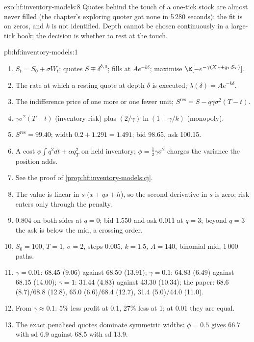 \begin{solution}{exo:hf:inventory-models:8}
Quotes behind the touch of a one-tick stock are almost never filled (the chapter's exploring quoter got none in 5\,280 seconds): the fit is on zeros,
and $k$ is not identified. Depth cannot be chosen continuously in a large-tick book; the decision is whether to rest at the touch.
\end{solution}

\begin{solution}{pb:hf:inventory-models:1}
\begin{enumerate}
\item $S_t=S_0+\sigma W_t$; quotes $S\mp\delta^{b,a}$; fills at $Ae^{-k\delta}$; maximise $\E[-e^{-\gamma(X_T+q_TS_T)}]$.
\item The rate at which a resting quote at depth $\delta$ is executed; $\lambda(\delta)=Ae^{-k\delta}$.
\item The indifference price of one more or one fewer unit; $S^{\mathrm{res}}=S-q\gamma\sigma^2(T-t)$.
\item $\gamma\sigma^2(T-t)$ (inventory risk) plus $(2/\gamma)\ln(1+\gamma/k)$ (monopoly).
\item $S^{\mathrm{res}}=99.40$; width $0.2+1.291=1.491$; bid 98.65, ask 100.15.
\item A cost $\phi\int q^2dt+\alpha q_T^2$ on held inventory; $\phi=\tfrac12\gamma\sigma^2$ charges the variance the position adds.
\item See the proof of \cref{prop:hf:inventory-models:cj}.
\item The value is linear in $s$ ($x+qs+h$), so the second derivative in $s$ is zero; risk enters only through the penalty.
\item 0.804 on both sides at $q=0$; bid 1.550 and ask 0.011 at $q=3$; beyond $q=3$ the ask is below the mid, a crossing order.
\item $S_0=100$, $T=1$, $\sigma=2$, steps 0.005, $k=1.5$, $A=140$, binomial mid, 1\,000 paths.
\item $\gamma=0.01$: 68.45 (9.06) against 68.50 (13.91); $\gamma=0.1$: 64.83 (6.49) against 68.15 (14.00); $\gamma=1$: 31.44 (4.83) against 43.30
(10.34); the paper: 68.6 (8.7)/68.8 (12.8), 65.0 (6.6)/68.4 (12.7), 31.4 (5.0)/44.0 (11.0).
\item From $\gamma\approx0.1$: 5\% less profit at 0.1, 27\% less at 1; at 0.01 they are equal.
\item The exact penalised quotes dominate symmetric widths: $\phi=0.5$ gives 66.7 with sd 6.9 against 68.5 with sd 13.9.

\end{enumerate}
\end{solution}
